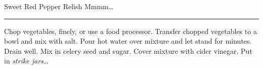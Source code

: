 \begin{recipe}{Sweet Red Pepper Relish}{}{}
\freeform Mmmm\ldots\\
\rule{\textwidth}{0.05pt}
Chop vegetables, finely, or use a food processor.
Transfer chopped vegetables to a bowl and mix with salt.
Pour hot water over mixture and let stand for \unit[15]{minutes}.
\newstep Drain well.
Mix in  celery seed and sugar.
Cover mixture with cider vinegar.
\newstep Put in \emph{strike jars}\ldots
\end{recipe}
